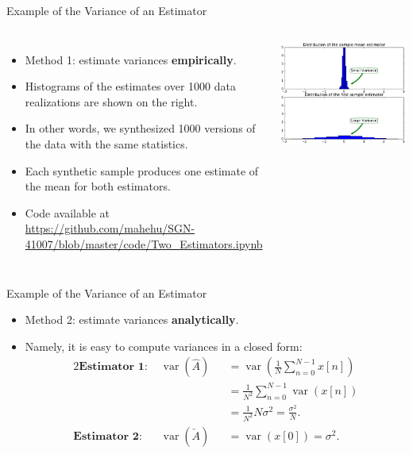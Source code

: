 \documentclass[10pt, aspectratio=169]{beamer} %
\newcommand{\var}{{\mathop{\text{var}}}}
\begin{document}
\begin{frame}{Example of the Variance of an Estimator}
\begin{columns}[onlytextwidth]
\begin{itemize}
\item Method 1: estimate variances \textbf{empirically}.
\item Histograms of the estimates over 1000 data realizations are shown on the right.
\item In other words, we synthesized 1000 versions of the data with the same
statistics.
\item Each synthetic sample produces one estimate of the mean for both estimators.
\item Code available at \url{https://github.com/mahehu/SGN-41007/blob/master/code/Two_Estimators.ipynb}
\begin{center}
\end{center}
\end{itemize}
\includegraphics[width=\textwidth]{2Estimators.pdf}
\end{columns}
\end{frame}



\begin{frame}{Example of the Variance of an Estimator}
\begin{itemize}
\item Method 2: estimate variances \textbf{analytically}.
\item Namely, it is easy to compute variances in a closed form:
\begin{alignat*}{2}
\textbf{Estimator 1: } & \var(\hat{A}) &&= \var\left(\frac1N\sum_{n=0}^{N-1}x[n]\right)\\
& && = \frac1{N^2}\sum_{n=0}^{N-1}\var(x[n])\\
& && = \frac1{N^2}N\sigma^2 =\frac{\sigma^2}{N}.\\
\textbf{Estimator 2: } & \var(\check{A}) && = \var(x[0]) = \sigma^2. 
\end{alignat*}
\end{itemize}
\end{frame}
\end{document}
